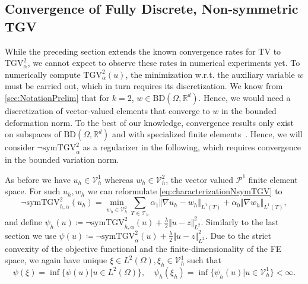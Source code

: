 \documentclass{article}
\newcommand{\R}{\mathbb{R}}
\newcommand{\TGV}{\mathrm{TGV}}
\newcommand{\NSymTGV}{\neg \mathrm{symTGV}}
\newcommand{\BD}{\mathrm{BD}}
\newcommand{\TV}{\mathrm{TV}}
\begin{document}
	\subsection{Convergence of Fully Discrete, Non-symmetric TGV}
	While the preceding section extends the known convergence rates for $\TV$ to $\TGV_\alpha^2$, we cannot expect to observe these rates in numerical experiments yet.
	To numerically compute $\TGV^2_{\alpha}(u)$, the minimization w.r.t. the auxiliary variable $w$ must be carried out, which in turn requires its discretization.
	We know from \cref{sec:NotationPrelim} that for $k=2$, $w\in\BD(\Omega, \R^d)$. Hence, we would need a discretization of vector-valued elements that converge to $w$ in the bounded deformation norm.
	To the best of our knowledge, convergence results only exist on subspaces of $\BD(\Omega, \R^d)$ and with specialized finite elements~\cite{Bab23, Co19}.
	Hence, we will consider $\NSymTGV_\alpha^2$ as a regularizer in the following, which requires convergence in the bounded variation norm.

	As before we have $u_h \in \mathcal{V}_h^1$ whereas $w_h \in  \mathcal{V}_h^2$, the vector valued $\mathcal{P}^1$ finite element space.
	For such $u_h, w_h$ we can reformulate \eqref{eq:characterizationNsymTGV} to 
	\begin{equation} 
		\label{eq:fullydiscretetgv}
		\NSymTGV_{h, \alpha}^2 (u_h)= \min_{w_h\in \mathcal{V}_h^2} \sum_{T\in\mathcal{T}_h} \alpha_1 \Vert \nabla u_h - w_h\Vert_{L^1(T)} + \alpha_0\Vert  \nabla w_h\Vert_{L^1(T)},
	\end{equation}
	and define $\psi_h(u) \coloneqq \NSymTGV_{h, \alpha}^2(u) + \frac{\lambda}{2}\Vert u - z\Vert _{L^2}^2$.
	Similarly to the last section we use $\psi(u) \coloneqq \NSymTGV_{\alpha}^2(u) + \frac{\lambda}{2}\Vert u - z\Vert _{L^2}^2$.
	Due to the strict convexity of the objective functional and the finite-dimensionality of the FE space, we again have unique $\xi \in L^2(\Omega), \xi_{h} \in \mathcal{V}_h^1$ such that
	\begin{equation}
		\label{def:discTGVdenoiseMin}
		\psi(\xi) = \inf \lbrace \psi(u) \rvert u \in L^2(\Omega)\rbrace,\quad \psi_h(\xi_{h}) = \inf \lbrace \psi_h(u) \rvert u \in \mathcal{V}_h^1\rbrace  < \infty.
	\end{equation}
\end{document}
